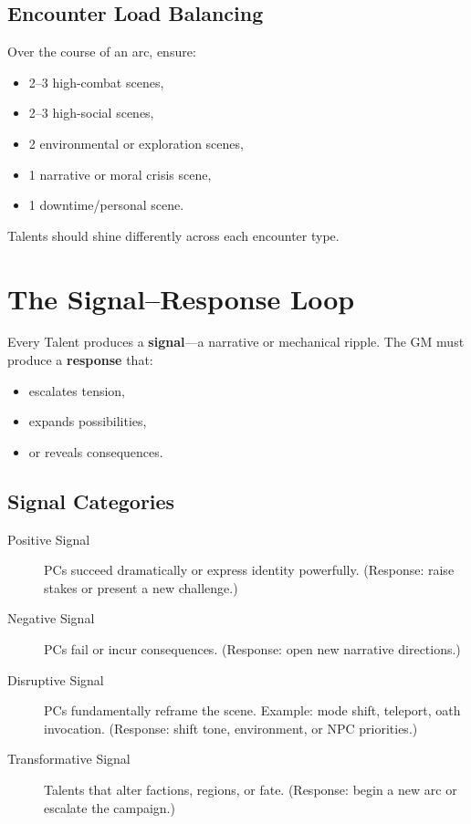 \documentclass[11pt]{book}
\begin{document}
\subsection{Encounter Load Balancing}

Over the course of an arc, ensure:
\begin{itemize}
    \item 2--3 high-combat scenes,
    \item 2--3 high-social scenes,
    \item 2 environmental or exploration scenes,
    \item 1 narrative or moral crisis scene,
    \item 1 downtime/personal scene.
\end{itemize}

Talents should shine differently across each encounter type.

\section{The Signal--Response Loop}

Every Talent produces a \textbf{signal}---a narrative or mechanical ripple.  
The GM must produce a \textbf{response} that:
\begin{itemize}
    \item escalates tension,
    \item expands possibilities,
    \item or reveals consequences.
\end{itemize}

\subsection{Signal Categories}

\begin{description}
    \item[Positive Signal]  
    PCs succeed dramatically or express identity powerfully.  
    (Response: raise stakes or present a new challenge.)

    \item[Negative Signal]  
    PCs fail or incur consequences.  
    (Response: open new narrative directions.)

    \item[Disruptive Signal]  
    PCs fundamentally reframe the scene.  
    Example: mode shift, teleport, oath invocation.  
    (Response: shift tone, environment, or NPC priorities.)

    \item[Transformative Signal]  
    Talents that alter factions, regions, or fate.  
    (Response: begin a new arc or escalate the campaign.)
\end{description}
\end{document}
